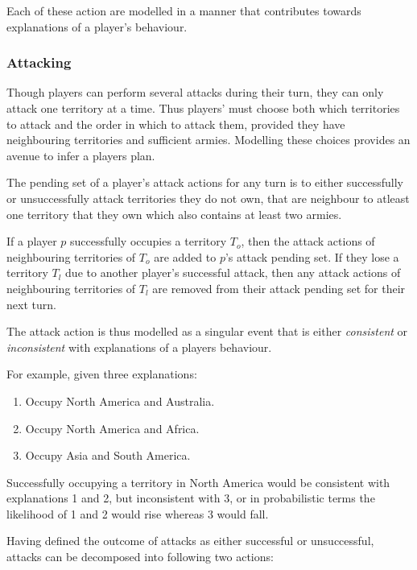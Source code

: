 \documentclass[parskip]{cs4rep}
\begin{document}
Each of these action are modelled in a manner that contributes towards explanations of a player's behaviour.

\subsubsection{Attacking}

Though players can perform several attacks during their turn, they can only attack one territory at a time. Thus players' must choose both which territories to attack and the order in which to attack them, provided they have neighbouring territories and sufficient armies. Modelling these choices provides an avenue to infer a players plan.

The pending set of a player's attack actions for any turn is to either successfully or unsuccessfully attack territories they do not own, that are neighbour to atleast one territory that they own which also contains at least two armies.

If a player $p$ successfully occupies a territory $T_{o}$, then the attack actions of neighbouring territories of $T_{o}$ are added to $p$'s attack pending set. If they lose a territory $T_{l}$ due to another player's successful attack, then any attack actions of neighbouring territories of $T_{l}$ are removed from their attack pending set for their next turn. 

The attack action is thus modelled as a singular event that is either \textit{consistent} or \textit{inconsistent} with explanations of a players behaviour.

For example, given three explanations:

\begin{enumerate}
\item
Occupy North America and Australia.
\item
Occupy North America and Africa.
\item
Occupy Asia and South America.
\end{enumerate}

Successfully occupying a territory in North America would be consistent with explanations 1 and 2, but inconsistent with 3, or in probabilistic terms the likelihood of 1 and 2 would rise whereas 3 would fall.

Having defined the outcome of attacks as either successful or unsuccessful, attacks can be decomposed into following two actions: 
\end{document}
